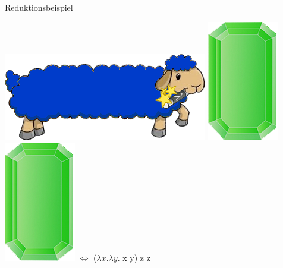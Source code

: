 \documentclass[18pt]{beamer}
\begin{document}
\begin{frame}{Reduktionsbeispiel}
	

	
\includegraphics[scale=1,7]{Pictures/lamb_long_blue_wm}\thinspace \thinspace   
 \includegraphics[scale=0.5]{Pictures/gem_green} \thinspace \thinspace 
\includegraphics[scale=0.5]{Pictures/gem_green}
\thinspace \thinspace \thinspace \thinspace \thinspace \thinspace $\Leftrightarrow$ \thinspace \thinspace \thinspace \thinspace \thinspace \thinspace ($\lambda x. \lambda y. $ x y) z z
\\[0.3cm]


\end{frame}
\end{document}
